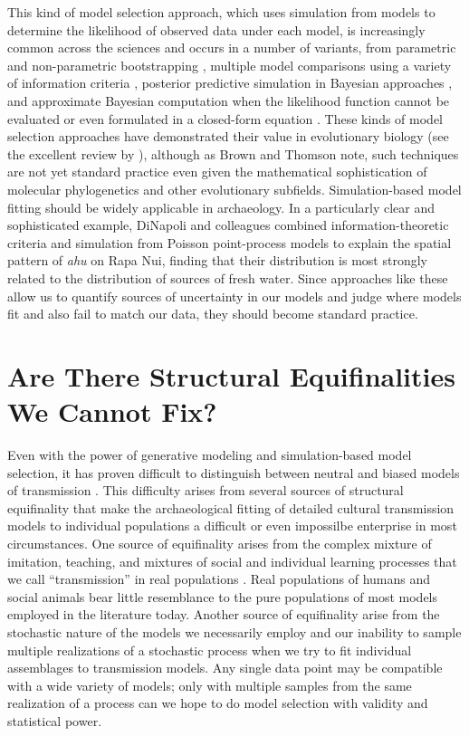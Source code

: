 This kind of model selection approach, which uses simulation from models to determine the likelihood of observed data under each model, is increasingly common across the sciences and occurs in a number of variants, from parametric and non-parametric bootstrapping \citep{efron1981nonparametric,efron1993introduction}, multiple model comparisons using a variety of information criteria \citep{burnham2002model}, posterior predictive simulation in Bayesian approaches \citep{gelman2013bayesian,gelman1996posterior,mcelreath2020statistical,robert1994bayesian}, and approximate Bayesian computation when the likelihood function cannot be evaluated or even formulated in a closed-form equation \citep{Beaumont2002,Toni2009,Beaumont2010,Csillery:2010jd,Marin2012,sisson2018handbook}.  These kinds of model selection approaches have demonstrated their value in evolutionary biology (see the excellent review by \citealp{brown2018modelperformance}), although as Brown and Thomson note, such techniques are not yet standard practice even given the mathematical sophistication of molecular phylogenetics and other evolutionary subfields.  Simulation-based model fitting should be widely applicable in archaeology.  In a particularly clear and sophisticated example, DiNapoli and colleagues \citeyearpar{dinapoli2019rapa} combined information-theoretic criteria and simulation from Poisson point-process models to explain the spatial pattern of \emph{ahu} on Rapa Nui, finding that their distribution is most strongly related to the distribution of sources of fresh water.  Since approaches like these allow us to quantify sources of uncertainty in our models and judge where models fit and also fail to match our data, they should become standard practice.  


\section{Are There Structural Equifinalities We Cannot Fix?}

Even with the power of generative modeling and simulation-based model selection, it has proven difficult to distinguish between neutral and biased models of transmission \citep{kandler2019analysing}. This difficulty arises from several sources of structural equifinality that make the archaeological fitting of detailed cultural transmission models to individual populations a difficult or even impossilbe enterprise in most circumstances.  One source of equifinality arises from the complex mixture of imitation, teaching, and mixtures of social and individual learning processes that we call ``transmission'' in real populations \citep{wimsatt2019articulating}.  Real populations of humans and social animals bear little resemblance to the pure populations of most models employed in the literature today.  Another source of equifinality arise from the stochastic nature of the models we necessarily employ and our inability to sample multiple realizations of a stochastic process when we try to fit individual assemblages to transmission models.  Any single data point may be compatible with a wide variety of models; only with multiple samples from the same realization of a process can we hope to do model selection with validity and statistical power.

